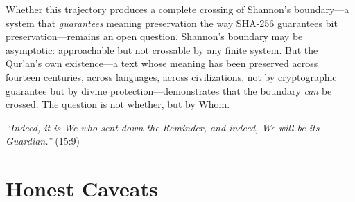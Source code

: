\documentclass[11pt,a4paper]{article}
\begin{document}
Whether this trajectory produces a complete crossing of Shannon's boundary---a system that \textit{guarantees} meaning preservation the way SHA-256 guarantees bit preservation---remains an open question. Shannon's boundary may be asymptotic: approachable but not crossable by any finite system. But the Qur'an's own existence---a text whose meaning has been preserved across fourteen centuries, across languages, across civilizations, not by cryptographic guarantee but by divine protection---demonstrates that the boundary \textit{can} be crossed. The question is not whether, but by Whom.

\textit{``Indeed, it is We who sent down the Reminder, and indeed, We will be its Guardian.''} (15:9)


\section*{Honest Caveats}
\end{document}
